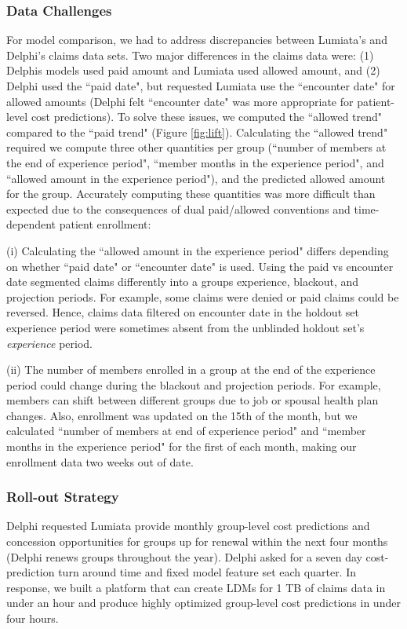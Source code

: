 \documentclass[letterpaper]{article}
\begin{document}
\subsubsection{Data Challenges}
For model comparison, we had to address discrepancies between Lumiata's and Delphi's claims data sets.  Two major differences in the claims data were:
(1) Delphis models used paid amount and Lumiata used allowed amount, and
(2) Delphi used the ``paid date", but requested Lumiata use the ``encounter date" for allowed amounts (Delphi felt ``encounter date" was more appropriate for patient-level cost predictions).
To solve these issues, we computed the ``allowed trend" compared to the ``paid trend" (Figure \ref{fig:lift}).  Calculating the ``allowed trend" required we compute three other quantities per group (``number of members at the end of experience period", ``member months in the experience period", and ``allowed amount in the experience period"), and the predicted allowed amount for the group.  Accurately computing these quantities was more difficult than expected due to the consequences of dual paid/allowed conventions and time-dependent patient enrollment:

(i) Calculating the ``allowed amount in the experience period" differs depending on whether ``paid date" or ``encounter date" is used. Using the paid vs encounter date segmented claims differently into a groups experience, blackout, and projection periods. For example, some claims were denied or paid claims could be reversed.  Hence, claims data filtered on encounter date in the holdout set experience period were sometimes absent from the unblinded holdout set's \textit{experience} period.

(ii)  The number of members enrolled in a group at the end of the experience period could change during the blackout and projection periods.  For example, members can shift between different groups due to job or spousal health plan changes. Also, enrollment was updated on the 15th of the month, but we calculated ``number of members at end of experience period" and ``member months in the experience period" for the first of each month, making our enrollment data two weeks out of date.

\subsubsection{Roll-out Strategy}\label{sec:deployment}
Delphi requested Lumiata provide monthly group-level cost predictions and concession opportunities for groups up for renewal within the next four months (Delphi renews groups throughout the year).  Delphi asked for a seven day cost-prediction turn around time and fixed model feature set each quarter.  In response, we built a platform that can create LDMs for 1 TB of claims data in under an hour and produce highly optimized group-level cost predictions in under four hours.
\end{document}

